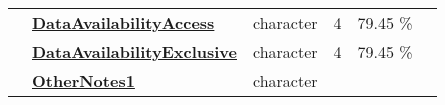 \documentclass[]{article}
\begin{document}
\begin{longtable}[]{@{}lllrcl@{}}
\begin{minipage}[t]{0.07\columnwidth}
\end{minipage} & \begin{minipage}[t]{0.35\columnwidth}\raggedright\strut
\textbf{\protect\hyperlink{dataavailabilityaccess}{DataAvailabilityAccess}}\strut
\end{minipage} & \begin{minipage}[t]{0.11\columnwidth}\raggedright\strut
character\strut
\end{minipage} & \begin{minipage}[t]{0.10\columnwidth}\raggedleft\strut
4\strut
\end{minipage} & \begin{minipage}[t]{0.10\columnwidth}\centering\strut
79.45 \%\strut
\end{minipage} & \begin{minipage}[t]{0.12\columnwidth}\raggedright\strut
\strut
\end{minipage}\tabularnewline
\begin{minipage}[t]{0.07\columnwidth}\raggedright\strut
\strut
\end{minipage} & \begin{minipage}[t]{0.35\columnwidth}\raggedright\strut
\textbf{\protect\hyperlink{dataavailabilityexclusive}{DataAvailabilityExclusive}}\strut
\end{minipage} & \begin{minipage}[t]{0.11\columnwidth}\raggedright\strut
character\strut
\end{minipage} & \begin{minipage}[t]{0.10\columnwidth}\raggedleft\strut
4\strut
\end{minipage} & \begin{minipage}[t]{0.10\columnwidth}\centering\strut
79.45 \%\strut
\end{minipage} & \begin{minipage}[t]{0.12\columnwidth}\raggedright\strut
\strut
\end{minipage}\tabularnewline
\begin{minipage}[t]{0.07\columnwidth}\raggedright\strut
\strut
\end{minipage} & \begin{minipage}[t]{0.35\columnwidth}\raggedright\strut
\textbf{\protect\hyperlink{othernotes1}{OtherNotes1}}\strut
\end{minipage} & \begin{minipage}[t]{0.11\columnwidth}\raggedright\strut
character\strut
\end{minipage} & \begin{minipage}[t]{0.10\columnwidth}\raggedleft\strut

\end{minipage}
\end{longtable}
\end{document}
